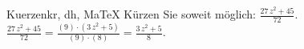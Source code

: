 \begin{MAufgabe}{Kuerzen}{kr, dh, MaTeX}
K\"urzen Sie soweit m\"oglich: $\frac{27\, z^2 + 45}{72}$.\\ 
\ifLsg\MLoesung
\quad $\frac{27\, z^2 + 45}{72}=\frac{(9)\cdot(3\, z^2 + 5)}{(9)\cdot(8)}=\frac{3\, z^2 + 5}{8}$.\else\relax\fi
 \end{MAufgabe}